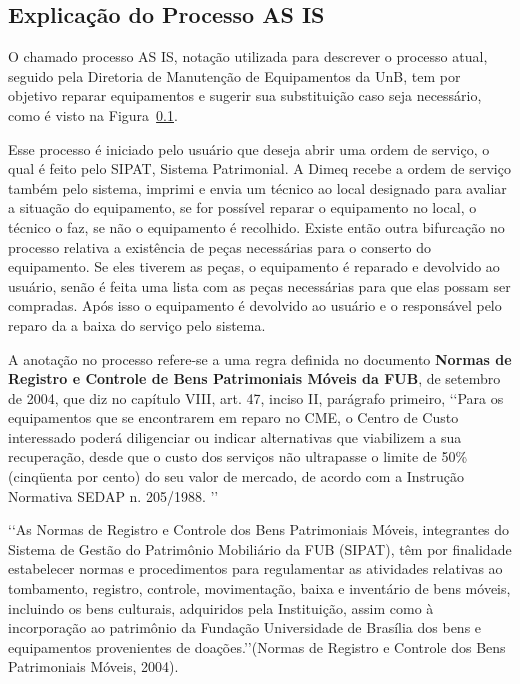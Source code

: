 
\subsection{Explicação do Processo AS IS}
\label{processo-as-is}

O chamado processo AS IS, notação utilizada para descrever o processo atual, seguido pela Diretoria de Manutenção de Equipamentos da UnB, tem por objetivo reparar equipamentos e sugerir sua substituição caso seja necessário, como é visto na Figura~\ref{processo-as-is}.

Esse processo é iniciado pelo usuário que deseja abrir uma ordem de serviço, o qual é feito pelo SIPAT, Sistema Patrimonial. A Dimeq recebe a ordem de serviço também pelo sistema, imprimi e envia um técnico ao local designado para avaliar a situação do equipamento, se for possível reparar o equipamento no local, o técnico o faz, se não o equipamento é recolhido. Existe então outra bifurcação no processo relativa a existência de peças necessárias para o conserto do equipamento. Se eles tiverem as peças, o equipamento é reparado e devolvido ao usuário, senão é feita uma lista com as peças necessárias para que elas possam ser compradas. Após isso o equipamento é devolvido ao usuário e o responsável pelo reparo da a baixa do serviço pelo sistema.

A anotação no processo refere-se a uma regra definida no documento \textbf{Normas de Registro e Controle de Bens Patrimoniais Móveis da FUB}, de setembro de 2004, que diz no capítulo VIII,  art. 47, inciso II, parágrafo primeiro, \lq\lq Para os equipamentos que se encontrarem em reparo no CME, o Centro de Custo interessado poderá diligenciar ou indicar alternativas que viabilizem a sua recuperação, desde que o custo dos serviços não ultrapasse o limite de 50\% (cinqüenta por cento) do seu valor de mercado, de acordo com a Instrução Normativa SEDAP n. 205/1988. \rq\rq

\lq\lq As Normas de Registro e Controle dos Bens Patrimoniais Móveis, integrantes do Sistema de Gestão do Patrimônio Mobiliário da FUB (SIPAT), têm por finalidade estabelecer normas e procedimentos para regulamentar as atividades relativas ao tombamento, registro, controle, movimentação, baixa e inventário de bens móveis, incluindo os bens culturais, adquiridos pela Instituição, assim como à incorporação ao patrimônio da Fundação Universidade de Brasília dos bens e equipamentos provenientes de doações.\rq\rq (Normas de Registro e Controle dos Bens Patrimoniais Móveis, 2004).

